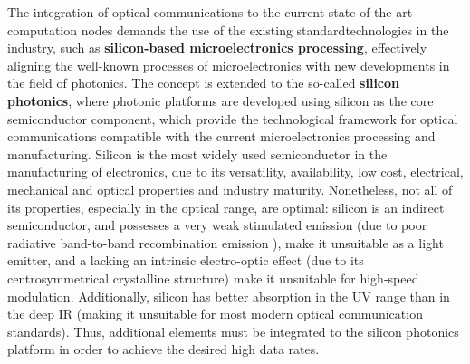 The integration of optical communications to the current state-of-the-art computation nodes demands the use of the existing standardtechnologies in the industry, such as \textbf{silicon-based microelectronics processing}, effectively aligning the well-known processes of microelectronics with new developments in the field of photonics. The concept is extended to the so-called \textbf{silicon photonics}, where photonic platforms are developed using silicon as the core semiconductor component, which provide the technological framework for optical communications compatible with the current microelectronics processing and manufacturing. Silicon is the most widely used semiconductor in the manufacturing of electronics, due to its versatility, availability, low cost, electrical, mechanical and optical properties and industry maturity. Nonetheless, not all of its properties, especially in the optical range, are optimal: silicon is an indirect semiconductor, and possesses a very weak stimulated emission (due to poor radiative band-to-band recombination emission \cite{PavesiSi06}), make it unsuitable as a light emitter, and a lacking an intrinsic electro-optic effect (due to its centrosymmetrical crystalline structure) make it unsuitable for high-speed modulation. Additionally, silicon has better absorption in the UV range than in the deep IR (making it unsuitable for most modern optical communication standards). Thus, additional elements must be integrated to the silicon photonics platform in order to achieve the desired high data rates. 

